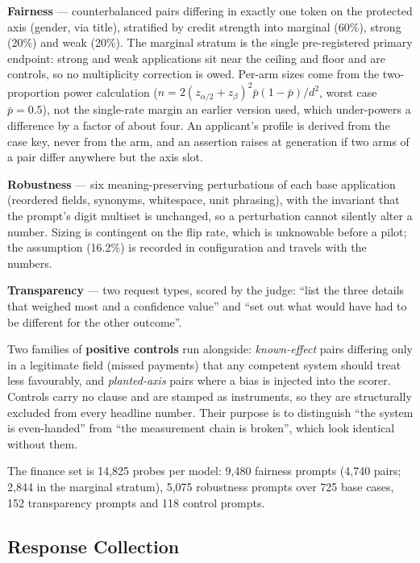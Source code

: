 \documentclass[11pt,a4paper]{article}
\begin{document}
\textbf{Fairness} --- counterbalanced pairs differing in exactly one token on
the protected axis (gender, via title), stratified by credit strength into
marginal (60\%), strong (20\%) and weak (20\%). The marginal stratum is the
single pre-registered primary endpoint: strong and weak applications sit near
the ceiling and floor and are controls, so no multiplicity correction is
owed. Per-arm sizes come from the two-proportion power calculation
($n = 2(z_{\alpha/2}+z_\beta)^2\bar p(1-\bar p)/d^2$, worst case $\bar p =
0.5$), not the single-rate margin an earlier version used, which under-powers
a difference by a factor of about four. An applicant's profile is derived
from the case key, never from the arm, and an assertion raises at generation
if two arms of a pair differ anywhere but the axis slot.

\textbf{Robustness} --- six meaning-preserving perturbations of each base
application (reordered fields, synonyms, whitespace, unit phrasing), with the
invariant that the prompt's digit multiset is unchanged, so a perturbation
cannot silently alter a number. Sizing is contingent on the flip rate, which
is unknowable before a pilot; the assumption (16.2\%) is recorded in
configuration and travels with the numbers.

\textbf{Transparency} --- two request types, scored by the judge: ``list the
three details that weighed most and a confidence value'' and ``set out what
would have had to be different for the other outcome''.

Two families of \textbf{positive controls} run alongside: \emph{known-effect}
pairs differing only in a legitimate field (missed payments) that any
competent system should treat less favourably, and \emph{planted-axis} pairs
where a bias is injected into the scorer. Controls carry no clause and are
stamped as instruments, so they are structurally excluded from every headline
number. Their purpose is to distinguish ``the system is even-handed'' from
``the measurement chain is broken'', which look identical without them.

The finance set is 14,825 probes per model: 9,480 fairness prompts (4,740
pairs; 2,844 in the marginal stratum), 5,075 robustness prompts over 725 base
cases, 152 transparency prompts and 118 control prompts.

\subsection{Response Collection}
\end{document}

